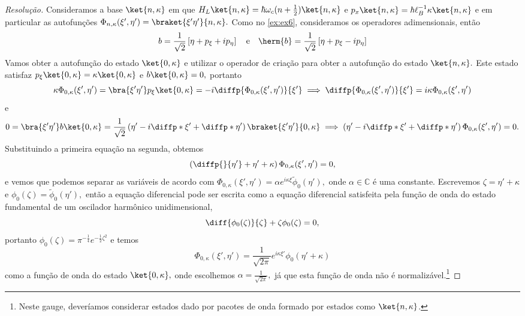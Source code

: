 \begin{proof}[Resolução]
   Consideramos a base \(\ket{n, \kappa}\) em que \(H_L \ket{n, \kappa} = \hbar \omega_c (n + \frac12) \ket{n,\kappa}\) e \(p_x \ket{n,\kappa} = \hbar \ell_B^{-1} \kappa \ket{n, \kappa}\) e em particular as autofunções \(\Phi_{n, \kappa}(\xi', \eta') = \braket{\xi'\eta'}{n,\kappa}.\) Como no \cref{ex:ex6}, consideramos os operadores adimensionais, então
   \begin{equation*}
      b = \frac{1}{\sqrt{2}} \left[\eta + p_\xi + ip_\eta\right]
      \quad\text{e}\quad
      \herm{b} = \frac{1}{\sqrt{2}} \left[\eta + p_\xi - ip_\eta\right]
   \end{equation*}
   Vamos obter a autofunção do estado \(\ket{0,\kappa}\) e utilizar o operador de criação para obter a autofunção do estado \(\ket{n, \kappa}.\) Este estado satisfaz \(p_\xi \ket{0,\kappa} = \kappa\ket{0,\kappa}\) e \(b\ket{0,\kappa} = 0,\) portanto 
   \begin{equation*}
      \kappa \Phi_{0, \kappa}(\xi', \eta') = \bra{\xi'\eta'} p_\xi \ket{0,\kappa} = -i \diffp{\Phi_{0, \kappa}(\xi', \eta')}{\xi'} \implies \diffp{\Phi_{0, \kappa}(\xi', \eta')}{\xi'} = i \kappa \Phi_{0, \kappa}(\xi', \eta')
   \end{equation*}
   e
   \begin{equation*}
      0 = \bra{\xi'\eta'} b \ket{0,\kappa}  = \frac{1}{\sqrt{2}}\left(\eta' - i \diffp*{}{\xi'} + \diffp*{}{\eta'}\right)\braket{\xi'\eta'}{0,\kappa} \implies \left(\eta' - i \diffp*{}{\xi'} + \diffp*{}{\eta'}\right)\Phi_{0, \kappa}(\xi', \eta') = 0.
   \end{equation*}
   Substituindo a primeira equação na segunda, obtemos
   \begin{equation*}
      \left(\diffp{}{\eta'} + \eta' +  \kappa\right)\Phi_{0, \kappa}(\xi', \eta') = 0,
   \end{equation*}
   e vemos que podemos separar as variáveis de acordo com \(\Phi_{0, \kappa}(\xi', \eta') = \alpha e^{i\kappa \xi} \tilde{\phi}_0(\eta'),\) onde \(\alpha \in \mathbb{C}\) é uma constante. Escrevemos \(\zeta = \eta' + \kappa\) e \(\phi_0(\zeta) = \tilde{\phi}_0(\eta'),\) então a equação diferencial pode ser escrita como a equação diferencial satisfeita pela função de onda do estado fundamental de um oscilador harmônico unidimensional,
   \begin{equation*}
      \diff{\phi_0(\zeta)}{\zeta} + \zeta \phi_0(\zeta) = 0,
   \end{equation*}
   portanto \(\phi_0(\zeta) = \pi^{-\frac14} e^{-\frac12 \zeta^2}\) e temos
   \begin{equation*}
      \Phi_{0, \kappa}(\xi', \eta') = \frac{1}{\sqrt{2\pi}}e^{i\kappa \xi'} \phi_0(\eta' + \kappa)
   \end{equation*}
   como a função de onda do estado \(\ket{0,\kappa},\) onde escolhemos \(\alpha = \frac{1}{\sqrt{2\pi}},\) já que esta função de onda não é normalizável.\footnote{Neste gauge, deveríamos considerar estados dado por pacotes de onda formado por estados como \(\ket{n, \kappa}\).} 


\end{proof}
